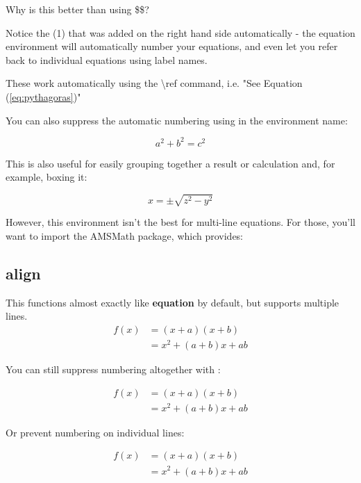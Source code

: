 \documentclass{article}
\begin{document}
        Why is this better than using \$\$?

        Notice the (1) that was added on the right hand side automatically - the equation environment will automatically number your equations, and even let you refer back to individual equations using label names.

        These work automatically using the \textbackslash ref command, i.e. "See Equation (\ref{eq:pythagoras})"

        \newpage

        You can also suppress the automatic numbering using \* in the environment name:

        \begin{equation*}
            a^2 + b^2 = c^2
            \label{eq:pythagoras2}
        \end{equation*}

        This is also useful for easily grouping together a result or calculation and, for example, boxing it:

        \begin{equation}
         \boxed{x = \pm \sqrt{z^2 - y^2}}
        \end{equation}

        However, this environment isn't the best for multi-line equations. For those, you'll want to import the AMSMath package, which provides:

    \subsection{align}
        This functions almost exactly like \textbf{equation} by default, but supports multiple lines.
        \begin{align}
         f(x) &= (x+a)(x+b) \\
              &= x^2 + (a+b)x + ab
        \end{align}

        You can still suppress numbering altogether with \*:

        \begin{align*}
         f(x) &= (x+a)(x+b) \\
              &= x^2 + (a+b)x + ab
        \end{align*}

        Or prevent numbering on individual lines:

        \begin{align}
         f(x) &= (x+a)(x+b) \nonumber \\
              &= x^2 + (a+b)x + ab
        \end{align}
\end{document}
